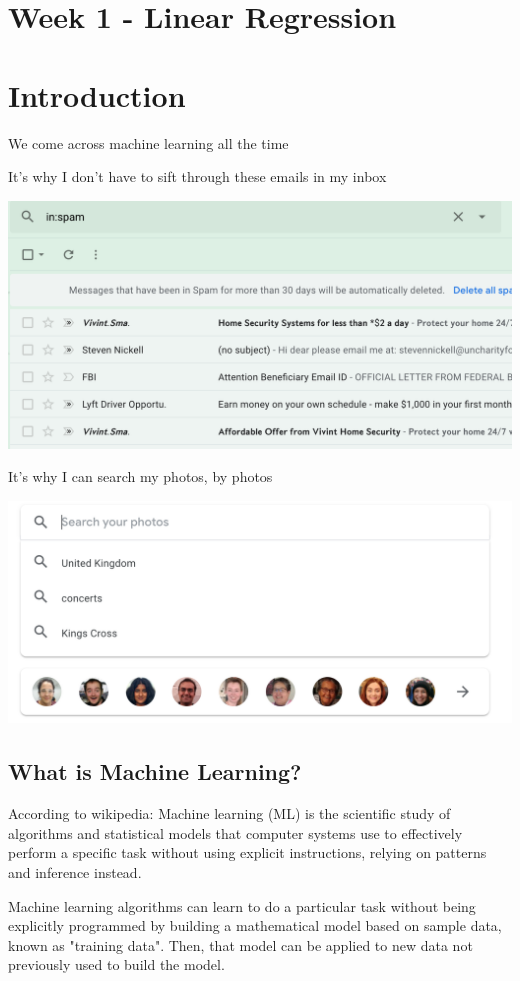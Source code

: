 \documentclass[12pt]{article}
\begin{document}
\section{Week 1 - Linear Regression}
\section{Introduction}
We come across  machine learning all the time 

It's why I don't have to sift through these emails in my inbox

\includegraphics[width=\textwidth]{spam}

It's why I can search my photos, by photos

\includegraphics[width=\textwidth]{photo-search}

\subsection{What is Machine Learning?}

According to wikipedia:
Machine learning (ML) is the scientific study of algorithms and statistical models that computer systems use to 
effectively perform a specific task without using explicit instructions, relying on patterns and inference instead.


Machine learning algorithms can learn to do a particular task without being explicitly programmed by building a 
mathematical model based on sample data, known as "training data". Then, that model can be applied to new data 
not previously used to build the model. 
\end{document}
